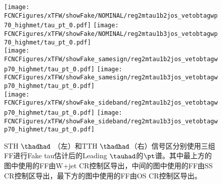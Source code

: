\begin{figure}[H]
\centering
\texttt{[image: \\FCNCFigures/xTFW/showFake/NOMINAL/reg2mtau1b2jos\_vetobtagwp70\_highmet/tau\_pt\_0.pdf]}
\texttt{[image: \\FCNCFigures/xTFW/showFake/NOMINAL/reg2mtau1b3jos\_vetobtagwp70\_highmet/tau\_pt\_0.pdf]}\\
\texttt{[image: \\FCNCFigures/xTFW/showFake\_samesign/reg2mtau1b2jos\_vetobtagwp70\_highmet/tau\_pt\_0.pdf]}
\texttt{[image: \\FCNCFigures/xTFW/showFake\_samesign/reg2mtau1b3jos\_vetobtagwp70\_highmet/tau\_pt\_0.pdf]}\\
\texttt{[image: \\FCNCFigures/xTFW/showFake\_sideband/reg2mtau1b2jos\_vetobtagwp70\_highmet/tau\_pt\_0.pdf]}
\texttt{[image: \\FCNCFigures/xTFW/showFake\_sideband/reg2mtau1b3jos\_vetobtagwp70\_highmet/tau\_pt\_0.pdf]}
\caption{STH $\thadhad$ （左）和TTH $\thadhad$（右）信号区分别使用三组FF进行Fake tau估计后的Leading $\tauhad$的$\pt$谱。其中最上方的图中使用的FF由W+jet CR控制区导出，中间的图中使用的FF由SS CR控制区导出，最下方的图中使用的FF由OS CR控制区导出。}
\label{fig:fakeEstimation_had}
\end{figure}

